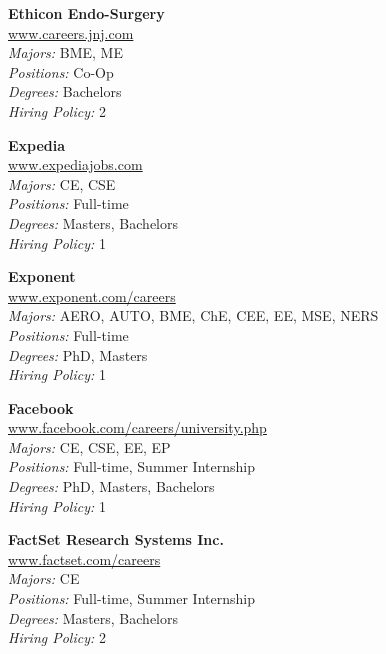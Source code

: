 \documentclass[twoside]{article}
\begin{document}
\begin{center}
\begin{multicols}{3}
\begin{minipage}{.9\columnwidth}{\Large\bf Ethicon Endo-Surgery }\\
	\url{www.careers.jnj.com}\\
	\emph{Majors:} BME, ME\\
	\emph{Positions:} Co-Op\\
	\emph{Degrees:} Bachelors\\
	\emph{Hiring Policy:} 2\\
\end{minipage}
 
\begin{minipage}{.9\columnwidth}{\Large\bf Expedia }\\
	\url{www.expediajobs.com}\\
	\emph{Majors:} CE, CSE\\
	\emph{Positions:} Full-time\\
	\emph{Degrees:} Masters, Bachelors\\
	\emph{Hiring Policy:} 1\\
\end{minipage}
 
\begin{minipage}{.9\columnwidth}{\Large\bf Exponent }\\
	\url{www.exponent.com/careers}\\
	\emph{Majors:} AERO, AUTO, BME, ChE, CEE, EE, MSE, NERS\\
	\emph{Positions:} Full-time\\
	\emph{Degrees:} PhD, Masters\\
	\emph{Hiring Policy:} 1\\
\end{minipage}
 
\begin{minipage}{.9\columnwidth}{\Large\bf Facebook }\\
	\url{www.facebook.com/careers/university.php}\\
	\emph{Majors:} CE, CSE, EE, EP\\
	\emph{Positions:} Full-time, Summer Internship\\
	\emph{Degrees:} PhD, Masters, Bachelors\\
	\emph{Hiring Policy:} 1\\
\end{minipage}
 
\begin{minipage}{.9\columnwidth}{\Large\bf FactSet Research Systems Inc. }\\
	\url{www.factset.com/careers}\\
	\emph{Majors:} CE\\
	\emph{Positions:} Full-time, Summer Internship\\
	\emph{Degrees:} Masters, Bachelors\\
	\emph{Hiring Policy:} 2\\
\end{minipage}
 

\end{multicols}
\end{center}
\end{document}
